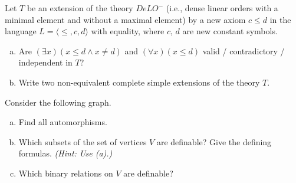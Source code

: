 \begin{problem}

    Let $T$ be an extension of the theory $DeLO^-$ (i.e., dense linear orders with a minimal element and without a maximal element) by a new axiom $c \le d$ in the language $L=\langle \le,c,d\rangle$ with equality, where $c$, $d$ are new constant symbols.
    \begin{enumerate}[(a)]
        \item Are $(\exists x)(x\le d \wedge x \ne d)$ and $(\forall x)(x \le d)$ valid / contradictory / independent in $T$?
        \item Write two non-equivalent complete simple extensions of the theory $T$.
    \end{enumerate}
    
\end{problem}


\begin{problem}

    Consider the following graph.
    \smallskip
    
    \begin{minipage}{.72\textwidth}
        \begin{enumerate}[(a)]
            \item Find all automorphisms.
            \item Which subsets of the set of vertices $V$ are definable? Give the defining formulas. {\it (Hint: Use (a).)}
            \item Which binary relations on $V$ are definable?
        \end{enumerate}
    \end{minipage}%
    \begin{minipage}{.28\textwidth}        
        \vspace{-12pt}\hspace{12pt}
    \end{minipage}%

\end{problem}



